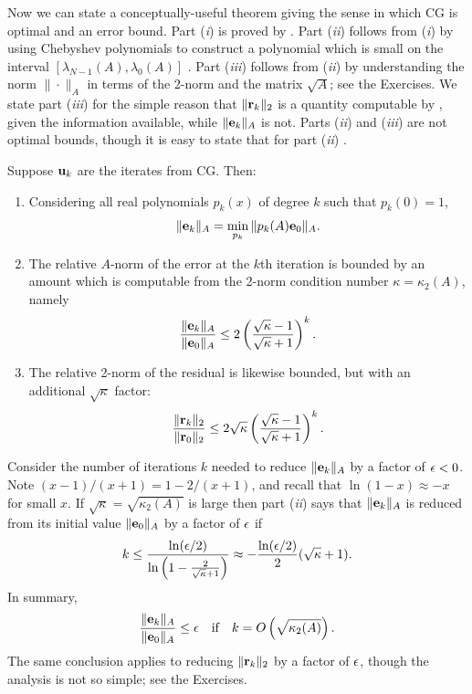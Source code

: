 Now we can state a conceptually-useful theorem giving the sense in which CG is optimal and an error bound.  Part (\emph{i}) is proved by \citet[p.~50]{Greenbaum1997}.  Part (\emph{ii}) follows from (\emph{i}) by using Chebyshev polynomials to construct a polynomial which is small on the interval $[\lambda_{N-1}(A),\lambda_0(A)]$ \citep[p.~51]{Greenbaum1997}.  Part (\emph{iii}) follows from (\emph{ii}) by understanding the norm $\|\cdot\|_A$ in terms of the 2-norm and the matrix $\sqrt{A}$; see the Exercises.  We state part (\emph{iii}) for the simple reason that $\|\mathbf{r}_k\|_2$ is a quantity computable by \PETSc, given the information available, while $\|\mathbf{e}_k\|_A$ is not.  Parts (\emph{ii}) and (\emph{iii}) are not optimal bounds, though it is easy to state that for part (\emph{ii}) \citep[p.~51]{Greenbaum1997}.

\renewcommand{\labelenumi}{(\roman{enumi})}
\begin{theorem}Suppose $\mathbf{u}_k$ are the iterates from CG.  Then:\begin{enumerate}
\item Considering all real polynomials $p_k(x)$ of degree $k$ such that $p_k(0)=1$,
    $$\|\mathbf{e}_k\|_A = \min_{p_k} \|p_k(A) \mathbf{e}_0\|_A.$$
\item The relative $A$-norm of the error at the $k$th iteration is bounded by an amount which is computable from the 2-norm condition number $\kappa=\kappa_2(A)$, namely
	$$\frac{\|\mathbf{e}_k\|_A}{\|\mathbf{e}_0\|_A} \le 2 \left(\frac{\sqrt{\kappa}-1}{\sqrt{\kappa}+1}\right)^k.$$
\item The relative 2-norm of the residual is likewise bounded, but with an additional $\sqrt{\kappa}$ factor:
	$$\frac{\|\mathbf{r}_k\|_2}{\|\mathbf{r}_0\|_2} \le 2 \sqrt{\kappa} \left(\frac{\sqrt{\kappa}-1}{\sqrt{\kappa}+1}\right)^k.$$
\end{enumerate}
\end{theorem}

Consider the number of iterations $k$ needed to reduce $\|\mathbf{e}_k\|_A$ by a factor of $\epsilon<0$.  Note $(x-1)/(x+1) = 1 - 2/(x+1)$, and recall that $\ln(1-x) \approx -x$ for small $x$.  If $\sqrt{\kappa} = \sqrt{\kappa_2(A)}$ is large then part (\emph{ii}) says that $\|\mathbf{e}_k\|_A$ is reduced from its initial value $\|\mathbf{e}_0\|_A$ by a factor of $\epsilon$ if
    $$k \le \frac{\ln(\epsilon/2)}{\ln\left(1 - \frac{2}{\sqrt{\kappa}+1}\right)} \approx -\frac{\ln(\epsilon/2)}{2} (\sqrt{\kappa}+1).$$
In summary,
\begin{equation}
\frac{\|\mathbf{e}_k\|_A}{\|\mathbf{e}_0\|_A} \le \epsilon \quad \text{if} \quad k = O\left(\sqrt{\kappa_2(A)}\right).  \label{cgkappaiter}
\end{equation}
The same conclusion applies to reducing $\|\mathbf{r}_k\|_2$ by a factor of $\epsilon$, though the analysis is not so simple; see the Exercises.

